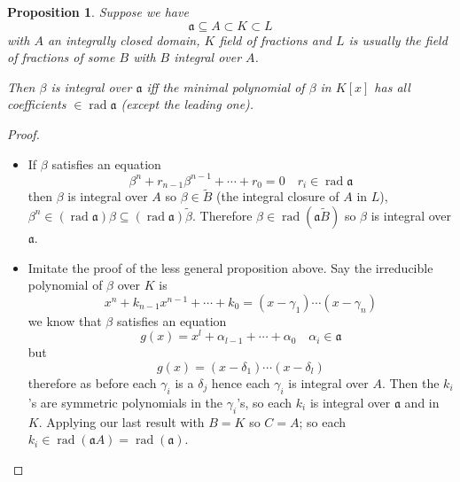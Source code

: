 \documentclass[11pt,a4paper]{article}
\theoremstyle{definition}
\theoremstyle{plain}
\newtheorem{proposition}[definition]{Proposition}
\theoremstyle{remark}
\newcommand{\rad}{\operatorname{rad}}
\begin{document}
\begin{proposition}
    Suppose we have 
    $$\mathfrak{a} \subseteq A \subset K \subset L$$
    with $A$ an integrally closed domain, $K$ field of fractions and $L$ is usually the field of fractions of some $B$ with $B$ integral over $A$.   

    Then $\beta$ is integral over $\mathfrak{a}$ iff the minimal polynomial of $\beta$ in $K[x]$ has all coefficients $\in \rad \mathfrak{a}$ (except the leading one). 
\end{proposition}

\begin{proof}
    \begin{itemize}
        \item[$\impliedby$] If $\beta$ satisfies an equation 
        $$\beta^n + r_{n-1} \beta^{n-1} + \cdots + r_0 = 0 \quad r_i \in \rad \mathfrak{a}$$
        then $\beta$ is integral over $A$ so $\beta \in \tilde{B}$ (the integral closure of $A$ in $L$), 
        $\beta^n \in (\rad \mathfrak{a}) \beta \subseteq (\rad \mathfrak{a}) \tilde{\beta}$. Therefore $\beta \in \rad (\mathfrak{a} \tilde{B})$ so $\beta$ is integral 
        over $\mathfrak{a}$.
        
        \item[$\implies$] Imitate the proof of the less general proposition above. Say the irreducible polynomial of $\beta$ over $K$ is 
        $$x^n + k_{n-1} x^{n-1} + \cdots + k_0 = (x- \gamma_1 ) \cdots (x- \gamma_n)$$
        we know that $\beta$ satisfies an equation 
        $$g(x) = x^l + \alpha_{l-1} + \cdots + \alpha_0 \quad \alpha_i \in \mathfrak{a}$$
        but 
        $$g(x) = (x- \delta_1) \cdots (x-\delta_l)$$
        therefore as before each $\gamma_i$ is a $\delta_j$ hence each $\gamma_i$ is integral over $A$. Then the $k_i$'s are symmetric polynomials 
        in the $\gamma_i$'s, so each $k_i$ is integral over $\mathfrak{a}$ and in $K$. Applying our last result with $B = K$ so $C = A$; so each $k_i \in \rad(\mathfrak{a} A) = \rad (\mathfrak{a})$. 
    \end{itemize}
\end{proof}
\end{document}

